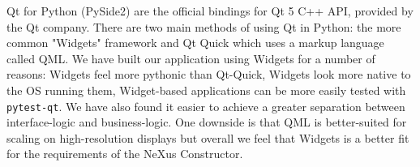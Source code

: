 Qt for Python (PySide2) are the official bindings for Qt 5 C++ API, provided by the Qt company. There are two main methods of using Qt in Python: the more common "Widgets" framework and Qt Quick which uses a markup language called QML. We have built our application using Widgets for a number of reasons: Widgets feel more pythonic than Qt-Quick, Widgets look more native to the OS running them, Widget-based applications can be more easily tested with \texttt{pytest-qt}. We have also found it easier to achieve a greater separation between interface-logic and business-logic. One downside is that QML is better-suited for scaling on high-resolution displays but overall we feel that Widgets is a better fit for the requirements of the NeXus Constructor.
\iffalse
\bigskip
The code snippet below shows the usage of a typical Qt3D view in python. Qt3D provides some high-level geometry types for adding cylinders, meshes, spheres as well as several other shapes. This is all wrapping OpenGL, and in the future Qt have stated they will support other graphics engines such as DirectX12, Vulkan and Metal. Currently there is some limited support for vulkan using the QVulkanWindow with a QVulkanInstance.
\fi
